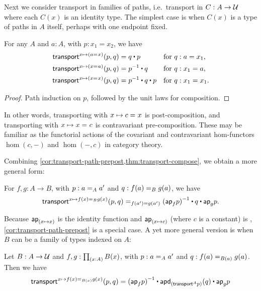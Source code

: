 Next we consider transport in families of paths, i.e.\ transport in $C:A\to\type$ where each $C(x)$ is an identity type.
The simplest case is when $C(x)$ is a type of paths in $A$ itself, perhaps with one endpoint fixed.

\begin{lem}\label{cor:transport-path-prepost}
  For any $A$ and $a:A$, with $p:x_1=x_2$, we have
  \begin{align*}
    \transfib{x \mapsto (\id{a}{x})} {p} {q} &= q \ct p
    & &\text{for $q:a=x_1$,}\\
    \transfib{x \mapsto (\id{x}{a})} {p} {q} &= \opp {p} \ct q 
    & &\text{for $q:x_1=a$,}\\
    \transfib{x \mapsto (\id{x}{x})} {p} {q} &= \opp{p} \ct q \ct p
    & &\text{for $q:x_1=x_1$.}
  \end{align*}
\end{lem}
\begin{proof}
  Path induction on $p$, followed by the unit laws for composition.
\end{proof}

In other words, transporting with ${x \mapsto \id{c}{x}}$ is post-composition, and transporting with ${x \mapsto \id{x}{c}}$ is contravariant pre-composition.
These may be familiar as the functorial actions of the covariant and contravariant hom-functors $\hom(c, {-})$ and $\hom({-},c)$ in category theory.

Combining \autoref{cor:transport-path-prepost,thm:transport-compose}, we obtain a more general form:

\begin{thm}\label{thm:transport-path}
  For $f,g:A\to B$, with $p : \id[A]{a}{a'}$ and $q : \id[B]{f(a)}{g(a)}$, we have
  \begin{equation*}
    \id[f(a') = g(a')]{\transfib{x \mapsto \id[B]{f(x)}{g(x)}}{p}{q}}
    {\opp{(\apfunc{f}{p})} \ct q \ct \apfunc{g}{p}}.
  \end{equation*}
\end{thm}

Because $\apfunc{(x \mapsto x)}$ is the identity function and $\apfunc{(x \mapsto c)}$ (where $c$ is a constant) is , \autoref{cor:transport-path-prepost} is a special case.
A yet more general version is when $B$ can be a family of types indexed on $A$:

\begin{thm}\label{thm:transport-path2}
  Let $B : A \to \type$ and $f,g : \prd{x:A} B(x)$, with $p : \id[A]{a}{a'}$ and $q : \id[B(a)]{f(a)}{g(a)}$.
  Then we have
  \begin{equation*}
    \transfib{x \mapsto \id[B(x)]{f(x)}{g(x)}}{p}{q} = 
    \opp{(\apfunc{f}{p})} \ct \apdfunc{(\transfibf{A}{p})}(q) \ct \apfunc{g}{p}
  \end{equation*}
\end{thm}

